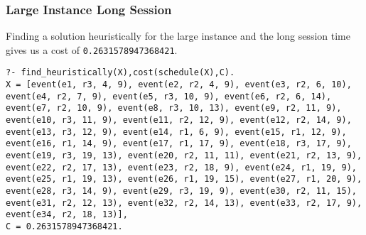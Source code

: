 \documentclass[a4paper]{article}
\begin{document}
\subsubsection{Large Instance Long Session}
Finding a solution heuristically for the large instance and the long session time gives us a cost of \texttt{0.2631578947368421}.
\begin{lstlisting}[style=Linux]
?- find_heuristically(X),cost(schedule(X),C).
X = [event(e1, r3, 4, 9), event(e2, r2, 4, 9), event(e3, r2, 6, 10),
event(e4, r2, 7, 9), event(e5, r3, 10, 9), event(e6, r2, 6, 14),
event(e7, r2, 10, 9), event(e8, r3, 10, 13), event(e9, r2, 11, 9),
event(e10, r3, 11, 9), event(e11, r2, 12, 9), event(e12, r2, 14, 9),
event(e13, r3, 12, 9), event(e14, r1, 6, 9), event(e15, r1, 12, 9),
event(e16, r1, 14, 9), event(e17, r1, 17, 9), event(e18, r3, 17, 9),
event(e19, r3, 19, 13), event(e20, r2, 11, 11), event(e21, r2, 13, 9),
event(e22, r2, 17, 13), event(e23, r2, 18, 9), event(e24, r1, 19, 9),
event(e25, r1, 19, 13), event(e26, r1, 19, 15), event(e27, r1, 20, 9),
event(e28, r3, 14, 9), event(e29, r3, 19, 9), event(e30, r2, 11, 15),
event(e31, r2, 12, 13), event(e32, r2, 14, 13), event(e33, r2, 17, 9),
event(e34, r2, 18, 13)],
C = 0.2631578947368421.
\end{lstlisting}
\end{document}
